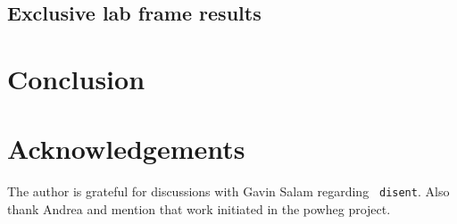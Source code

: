 \documentclass[submission, PhysCodeb]{SciPost}
\begin{document}
\subsection{Exclusive lab frame results}

\section{Conclusion}
\label{sec:conclusion}

\section*{Acknowledgements}
The author is grateful for discussions with Gavin Salam regarding {\tt
  disent}. Also thank Andrea and mention that work initiated in the
powheg project.


%
%



\nolinenumbers
\end{document}
